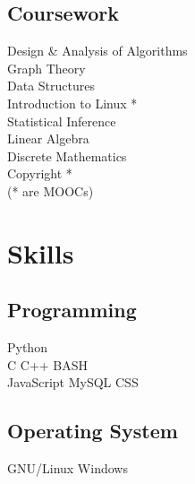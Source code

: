 \documentclass[]{deedy-resume-openfont}
\begin{document}
\begin{minipage}[t]{0.33\textwidth}


\subsection{Coursework}
Design \& Analysis of Algorithms \\
Graph Theory \\
Data Structures \\
Introduction to Linux {*}\\
Statistical Inference \\
Linear Algebra \\
Discrete Mathematics \\
Copyright {*}
\\
({*} are MOOCs)
\sectionsep


\section{Skills}
\subsection{Programming}
\textbullet{} Python \\
\textbullet{} C \textbullet{} C++ \textbullet{} BASH \\
\textbullet{} JavaScript \textbullet{} MySQL \textbullet{} CSS \\
\subsection{Operating System}
\textbullet{} GNU/Linux \textbullet{} Windows

\end{minipage}
\end{document}
